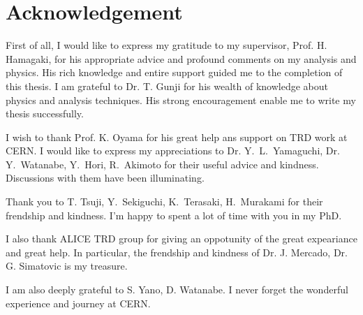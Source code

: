 \chapter*{Acknowledgement}
%
%








First of all, I would like to express my gratitude to my supervisor, Prof. H. Hamagaki, for his appropriate advice and profound comments on my analysis and physics. His rich knowledge and entire support guided me to the completion of this thesis.
I am grateful to Dr. T. Gunji for his wealth of knowledge about physics and analysis techniques. 
His strong encouragement enable me to write my thesis successfully.  

I wish to thank Prof. K. Oyama for his great help ans support on TRD work at CERN. 
I would like to express my appreciations to Dr. Y.~L.~Yamaguchi, Dr. Y.~Watanabe, Y.~Hori, R.~Akimoto for their useful advice and kindness. 
Discussions with them have been illuminating. 

Thank you to T. Tsuji, Y.~Sekiguchi, K.~Terasaki, H.~Murakami for their frendship and kindness. 
I'm happy to spent a lot of time with you in my PhD. 

I also thank ALICE TRD group for giving an oppotunity of the great expeariance and great help. 
In particular, the frendship and kindness of Dr. J. Mercado, Dr. G. Simatovic is my treasure. 

I am also deeply grateful to S. Yano, D. Watanabe.
I never forget the wonderful experience and journey at CERN.  


